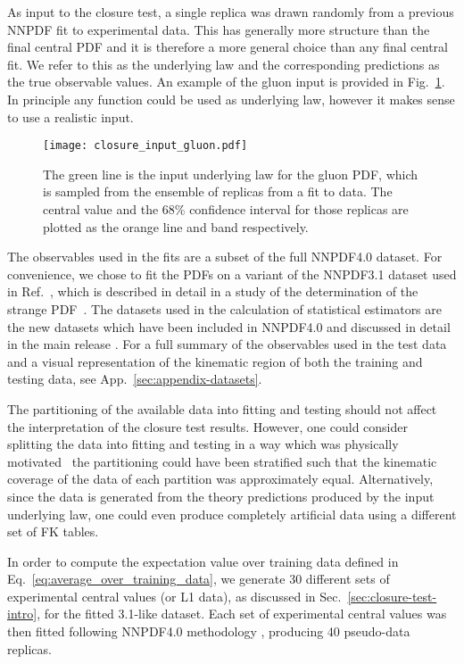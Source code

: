 As input to the closure test, a single replica was drawn randomly from a
previous NNPDF fit to experimental data. This
has generally more structure than the final central PDF and it is therefore a
more general choice than any final central fit. We refer to this as the underlying law
and the corresponding predictions as the true observable values. An example of
the gluon input is provided in Fig.~\ref{fig:InputGluonPDF}. In principle any
function could be used as underlying law, however it makes sense to use a
realistic input. 

\begin{figure}
    \centering
    \texttt{[image: closure\_input\_gluon.pdf]}
    \caption{The green line is the input underlying law for the gluon PDF, which
    is sampled from the ensemble of replicas from a fit to data. The central
    value and the 68\% confidence interval for those replicas are plotted as the
    orange line and band respectively.}
    \label{fig:InputGluonPDF}
\end{figure}

The observables used in the fits are a subset of the full NNPDF4.0 dataset. For
convenience, we chose to fit the PDFs on a variant of the NNPDF3.1 dataset used
in Ref.~\cite{Ball_2018}, which is described in detail in a study of the
determination of the strange PDF~\cite{Faura_2020}. The datasets used in the
calculation of statistical estimators are the new datasets which have been
included in NNPDF4.0 and discussed in detail in the main release \cite{NNPDF40}. For a
full summary of the observables used in the test data and a visual representation of
the kinematic region of both the training and testing data, see
App.~\ref{sec:appendix-datasets}.

The partitioning of the available data into fitting and testing should not
affect the interpretation of the closure test results. However, one
could consider splitting the data into fitting and testing in a way which was
physically motivated \eg\ the partitioning could have been
stratified such that the kinematic coverage of the data of each partition
was approximately equal.
Alternatively, since the data is generated from the theory predictions produced
by the input underlying law, one could even produce completely artificial data
using a different set of FK tables. 

In order to compute the expectation value over training data defined in
Eq.~\ref{eq:average_over_training_data}, we generate 30 different sets of
experimental central values (or L1 data), as discussed in
Sec.~\ref{sec:closure-test-intro}, for the fitted 3.1-like dataset. Each set of
experimental central values was then fitted following NNPDF4.0 methodology
\cite{NNPDF40}, producing 40 pseudo-data replicas.


